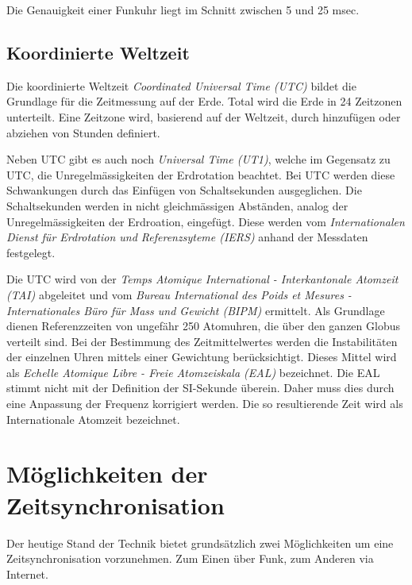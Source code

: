 Die Genauigkeit einer Funkuhr liegt im Schnitt zwischen 5 und 25 msec.


\subsection{Koordinierte Weltzeit}
Die koordinierte Weltzeit \textit{Coordinated Universal Time (UTC)} bildet die Grundlage für die Zeitmessung auf der Erde. Total wird die Erde in 24 Zeitzonen unterteilt. Eine Zeitzone wird, basierend auf der Weltzeit, durch hinzufügen oder abziehen von Stunden definiert.

Neben UTC gibt es auch noch \textit{Universal Time (UT1)}, welche im Gegensatz zu UTC, die Unregelmässigkeiten der Erdrotation beachtet. Bei UTC werden diese Schwankungen durch das Einfügen von Schaltsekunden ausgeglichen. Die Schaltsekunden werden in nicht gleichmässigen Abständen, analog der Unregelmässigkeiten der Erdroation, eingefügt. Diese werden vom \textit{Internationalen Dienst für Erdrotation und Referenzsyteme (IERS)}  anhand der Messdaten festgelegt.

Die UTC wird von der \textit{Temps Atomique International - Interkantonale Atomzeit (TAI)} abgeleitet und vom \textit{Bureau International des Poids et Mesures - Internationales Büro für Mass und Gewicht (BIPM)} ermittelt.
Als Grundlage dienen Referenzzeiten von ungefähr 250 Atomuhren, die über den ganzen Globus verteilt sind.
Bei der Bestimmung des Zeitmittelwertes werden die Instabilitäten der einzelnen Uhren mittels einer Gewichtung berücksichtigt. Dieses Mittel wird als \textit{Echelle Atomique Libre - Freie Atomzeiskala (EAL)} bezeichnet. Die EAL stimmt nicht mit der Definition der SI-Sekunde überein. Daher muss dies durch eine Anpassung der Frequenz korrigiert werden. Die so resultierende Zeit wird als Internationale Atomzeit bezeichnet. 


\section{Möglichkeiten der Zeitsynchronisation}
Der heutige Stand der Technik bietet grundsätzlich zwei Möglichkeiten um eine Zeitsynchronisation vorzunehmen. Zum Einen über Funk, zum Anderen via Internet.

